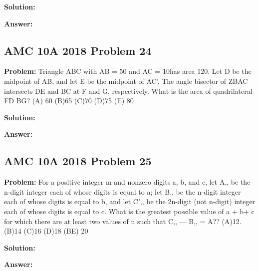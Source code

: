 \documentclass{article}
\newenvironment{problem}{\textbf{Problem: }}{\\}
\newenvironment{solution}{\textbf{Solution: }}{\\}
\newenvironment{answer}{\textbf{Answer: }}{\\}
\begin{document}
\begin{solution}
\end{solution}

\begin{answer}
\end{answer}

\subsection{AMC 10A 2018 Problem 24}

\begin{problem}
Triangle ABC with AB = 50 and AC = 10has area 120. Let D be the midpoint of AB, and let E be the midpoint of AC’. The angle bisector of ZBAC intersects DE and BC at F and G, respectively. What is the area of quadrilateral FD BG? (A) 60 (B)65 (C)70 (D)75 (E) 80
\end{problem}

\begin{solution}
\end{solution}

\begin{answer}
\end{answer}

\subsection{AMC 10A 2018 Problem 25}

\begin{problem}
For a positive integer m and nonzero digits a, b, and c, let A,, be the n-digit integer each of whose digits is equal to a; let B,, be the n-digit integer each of whose digits is equal to b, and let C’,, be the 2n-digit (not n-digit) integer each of whose digits is equal to c. What is the greatest possible value of a + b+ c for which there are at least two values of n such that C,, — B,, = A?? (A)12. (B)14 (C)16 (D)18 (BE) 20
\end{problem}

\begin{solution}
\end{solution}

\begin{answer}
\end{answer}
\end{document}
